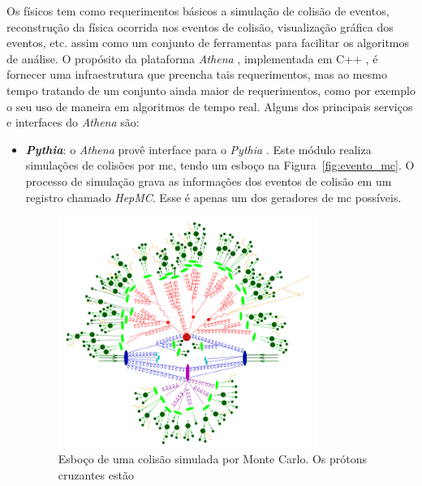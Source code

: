 
Os físicos tem como requerimentos básicos a simulação de colisão de
eventos, reconstrução da física ocorrida nos eventos de colisão, visualização
gráfica dos eventos, etc. assim como um conjunto de ferramentas para facilitar
os algoritmos de análise. O propósito da plataforma \emph{Athena}
\cite{atlascwb,atlaswb}, implementada em C++ \cite{CPP_COMPLETE}, 
é fornecer uma infraestrutura que preencha tais requerimentos, 
mas ao mesmo tempo tratando de um conjunto ainda maior de 
requerimentos, como por exemplo o seu uso de maneira em algoritmos de tempo real. 
Alguns dos principais serviços e interfaces do \emph{Athena} são:

\begin{itemize}
\item \textbf{\emph{Pythia}}: o \emph{Athena} provê interface para o
\emph{Pythia} \cite{pythia}. Este módulo
realiza simulações de colisões por \gls{mc}, tendo um esboço na
Figura~\ref{fig:evento_mc}. O processo de simulação grava as
informações dos eventos de colisão em um registro chamado \emph{HepMC}. Esse é
apenas um dos geradores de \gls{mc} possíveis.
\begin{figure}[b!]
\centering
\includegraphics[width=0.8\textwidth]{imagens/evento_mc.png}
\begin{minipage}{\textwidth}
\setcounter{mpfootnote}{\value{footnote}}
\renewcommand{\thempfootnote}{\arabic{mpfootnote}}
\caption[Esboço de uma colisão simulada por Monte Carlo]{
Esboço de uma colisão simulada por Monte Carlo. Os prótons cruzantes estão
}
\end{minipage}
\end{figure}
\end{itemize}
